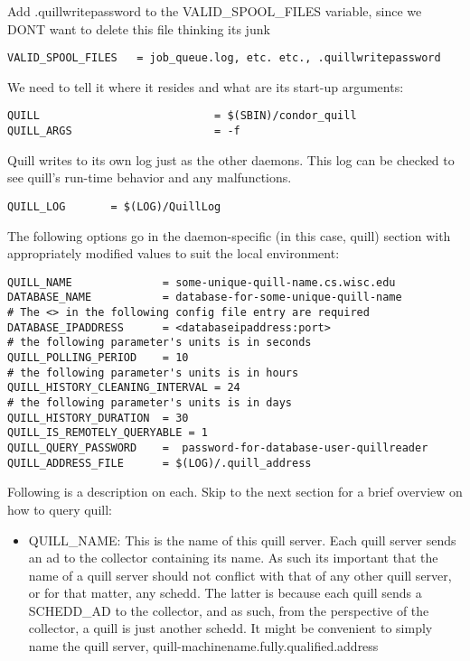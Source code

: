 \begin{enumerate}
Add .quillwritepassword to the VALID\_SPOOL\_FILES variable, since we 
DONT want  to delete this file thinking its junk
\begin{verbatim}
VALID_SPOOL_FILES	= job_queue.log, etc. etc., .quillwritepassword
\end{verbatim}

We need to tell it where it resides and what are its start-up arguments:
\begin{verbatim}
QUILL                           = $(SBIN)/condor_quill
QUILL_ARGS                      = -f
\end{verbatim}

Quill writes to its own log just as the other daemons.  This log can be 
checked to see quill's run-time behavior and any malfunctions.
\begin{verbatim}
QUILL_LOG       = $(LOG)/QuillLog
\end{verbatim}

The following options go in the daemon-specific (in this case, quill) 
section with appropriately modified values to suit the local environment:

\begin{verbatim}
QUILL_NAME              = some-unique-quill-name.cs.wisc.edu
DATABASE_NAME           = database-for-some-unique-quill-name
# The <> in the following config file entry are required
DATABASE_IPADDRESS      = <databaseipaddress:port>
# the following parameter's units is in seconds
QUILL_POLLING_PERIOD    = 10
# the following parameter's units is in hours
QUILL_HISTORY_CLEANING_INTERVAL = 24
# the following parameter's units is in days
QUILL_HISTORY_DURATION 	= 30
QUILL_IS_REMOTELY_QUERYABLE = 1
QUILL_QUERY_PASSWORD 	=  password-for-database-user-quillreader
QUILL_ADDRESS_FILE      = $(LOG)/.quill_address
\end{verbatim}

Following is a description on each.  Skip to the next section for a brief 
overview on how to query quill:

\begin{itemize}
\item QUILL\_NAME: 
This is the name of this quill server.  Each quill server sends an ad to
the collector containing its name.  As such its important that the name of
a quill server should not conflict with that of any other quill server,
or for that matter, any schedd.  The latter is because each quill sends
a SCHEDD\_AD to the collector, and as such, from the perspective of the
collector, a quill is just another schedd. It might be convenient to
simply name the quill server, quill-machinename.fully.qualified.address


\end{itemize}
\end{enumerate}
